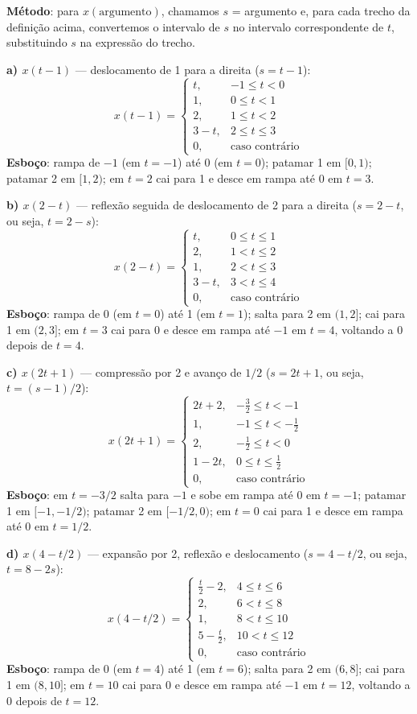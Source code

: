 \textbf{Método}: para \(x(\text{argumento})\), chamamos \(s\) = argumento e, para cada trecho da definição acima, convertemos o intervalo de \(s\) no intervalo correspondente de \(t\), substituindo \(s\) na expressão do trecho.

\textbf{a) \(x(t - 1)\)} --- deslocamento de 1 para a direita (\(s = t - 1\)):
\[x(t-1) = \begin{cases} t, & -1 \le t < 0 \\ 1, & 0 \le t < 1 \\ 2, & 1 \le t < 2 \\ 3 - t, & 2 \le t \le 3 \\ 0, & \text{caso contrário} \end{cases}\]
\textbf{Esboço}: rampa de \(-1\) (em \(t = -1\)) até 0 (em \(t = 0\)); patamar 1 em \([0, 1)\); patamar 2 em \([1, 2)\); em \(t = 2\) cai para 1 e desce em rampa até 0 em \(t = 3\).

\textbf{b) \(x(2 - t)\)} --- reflexão seguida de deslocamento de 2 para a direita (\(s = 2 - t\), ou seja, \(t = 2 - s\)):
\[x(2-t) = \begin{cases} t, & 0 \le t \le 1 \\ 2, & 1 < t \le 2 \\ 1, & 2 < t \le 3 \\ 3 - t, & 3 < t \le 4 \\ 0, & \text{caso contrário} \end{cases}\]
\textbf{Esboço}: rampa de 0 (em \(t = 0\)) até 1 (em \(t = 1\)); salta para 2 em \((1, 2]\); cai para 1 em \((2, 3]\); em \(t = 3\) cai para 0 e desce em rampa até \(-1\) em \(t = 4\), voltando a 0 depois de \(t = 4\).

\textbf{c) \(x(2t + 1)\)} --- compressão por 2 e avanço de \(1/2\) (\(s = 2t + 1\), ou seja, \(t = (s - 1)/2\)):
\[x(2t+1) = \begin{cases} 2t + 2, & -\tfrac{3}{2} \le t < -1 \\ 1, & -1 \le t < -\tfrac{1}{2} \\ 2, & -\tfrac{1}{2} \le t < 0 \\ 1 - 2t, & 0 \le t \le \tfrac{1}{2} \\ 0, & \text{caso contrário} \end{cases}\]
\textbf{Esboço}: em \(t = -3/2\) salta para \(-1\) e sobe em rampa até 0 em \(t = -1\); patamar 1 em \([-1, -1/2)\); patamar 2 em \([-1/2, 0)\); em \(t = 0\) cai para 1 e desce em rampa até 0 em \(t = 1/2\).

\textbf{d) \(x(4 - t/2)\)} --- expansão por 2, reflexão e deslocamento (\(s = 4 - t/2\), ou seja, \(t = 8 - 2s\)):
\[x(4 - t/2) = \begin{cases} \tfrac{t}{2} - 2, & 4 \le t \le 6 \\ 2, & 6 < t \le 8 \\ 1, & 8 < t \le 10 \\ 5 - \tfrac{t}{2}, & 10 < t \le 12 \\ 0, & \text{caso contrário} \end{cases}\]
\textbf{Esboço}: rampa de 0 (em \(t = 4\)) até 1 (em \(t = 6\)); salta para 2 em \((6, 8]\); cai para 1 em \((8, 10]\); em \(t = 10\) cai para 0 e desce em rampa até \(-1\) em \(t = 12\), voltando a 0 depois de \(t = 12\).

